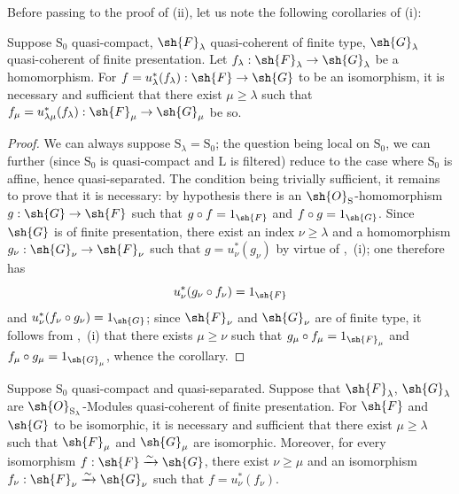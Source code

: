 Before passing to the proof of (ii), let us note the following corollaries of (i):

\begin{corollary}[8.5.2.4]
\label{IV.8.5.2.4}
Suppose $\mathrm{S}_0$ quasi-compact, $\sh{F}_\lambda$ quasi-coherent of finite type, $\sh{G}_\lambda$ quasi-coherent of finite presentation.
Let $f_\lambda:\sh{F}_\lambda\to\sh{G}_\lambda$ be a homomorphism.
For $f=u_\lambda^*(f_\lambda):\sh{F}\to\sh{G}$ to be an isomorphism, it is necessary and sufficient that there exist $\mu\geqslant\lambda$ such that $f_\mu=u_{\lambda\mu}^*(f_\lambda):\sh{F}_\mu\to\sh{G}_\mu$ be so.
\end{corollary}

\begin{proof}
We can always suppose $\mathrm{S}_\lambda=\mathrm{S}_0$; the question being local on $\mathrm{S}_0$, we can further (since $\mathrm{S}_0$ is quasi-compact and $\mathrm{L}$ is filtered) reduce to the case where $\mathrm{S}_0$ is affine, hence quasi-separated.
The condition being trivially sufficient, it remains to prove that it is necessary: by hypothesis there is an $\sh{O}_\mathrm{S}$-homomorphism $g:\sh{G}\to\sh{F}$ such that $g\circ f=1_\sh{F}$ and $f\circ g=1_\sh{G}$.
Since $\sh{G}$ is of finite presentation, there exist an index $\nu\geqslant\lambda$ and a homomorphism $g_\nu:\sh{G}_\nu\to\sh{F}_\nu$ such that $g=u_\nu^*(g_\nu)$ by virtue of ,~(i); one therefore has
\[
  u_\nu^*(g_\nu\circ f_\nu)=1_\sh{F}
\]
and $u_\nu^*(f_\nu\circ g_\nu)=1_\sh{G}$; since $\sh{F}_\nu$ and $\sh{G}_\nu$ are of finite type, it follows from ,~(i) that there exists $\mu\geqslant\nu$ such that $g_\mu\circ f_\mu=1_{\sh{F}_\mu}$ and $f_\mu\circ g_\mu=1_{\sh{G}_\mu}$, whence the corollary.
\end{proof}

\begin{corollary}[8.5.2.5]
\label{IV.8.5.2.5}
Suppose $\mathrm{S}_0$ quasi-compact and quasi-separated.
Suppose that $\sh{F}_\lambda$, $\sh{G}_\lambda$ are $\sh{O}_{\mathrm{S}_\lambda}$-Modules quasi-coherent of finite presentation.
For $\sh{F}$ and $\sh{G}$ to be isomorphic, it is necessary and sufficient that there exist $\mu\geqslant\lambda$ such that $\sh{F}_\mu$ and $\sh{G}_\mu$ are isomorphic.
Moreover, for every isomorphism $f:\sh{F}\xrightarrow{\sim}\sh{G}$, there exist $\nu\geqslant\mu$ and an isomorphism $f_\nu:\sh{F}_\nu\xrightarrow{\sim}\sh{G}_\nu$ such that $f=u_\nu^*(f_\nu)$.
\end{corollary}

